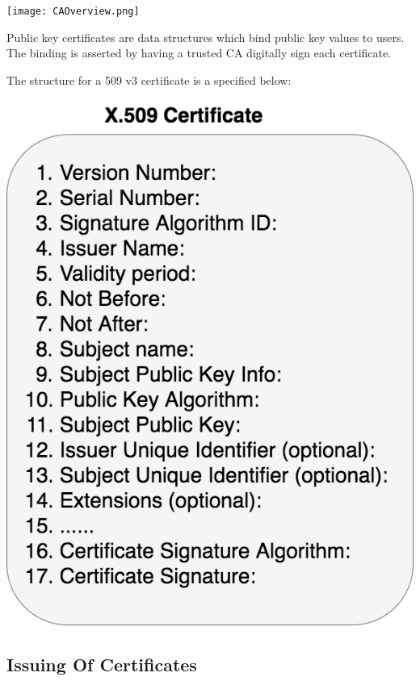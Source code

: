 \vspace{30pt}


\begin{center}
  \texttt{[image: CAOverview.png]}
  \label{fig:Prob1:MEA}
\end{center}

\vspace{30pt}

Public key certificates are data structures which bind public key values to users. The binding is asserted by having a trusted CA digitally sign each certificate.

The structure for a 509 v3 certificate is a specified below:


\begin{center}
  \includegraphics[scale=.5]{X509.png}
  \label{fig:Prob1:MEA}
\end{center}



\subsection{Issuing Of Certificates}

